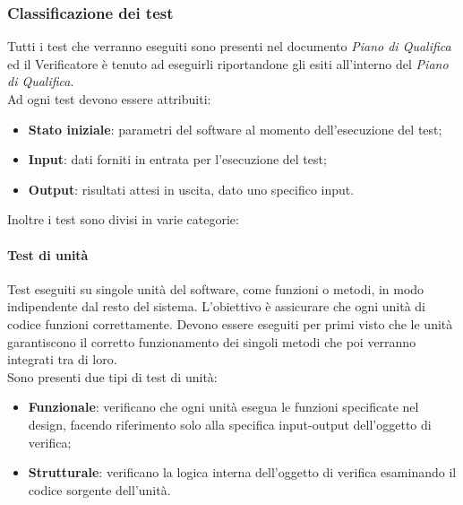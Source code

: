 \documentclass[10pt]{article}
\begin{document}
\begin{justify}
    \subsubsection{Classificazione dei test}
    Tutti i test che verranno eseguiti sono presenti nel documento \textit{Piano di Qualifica} ed il Verificatore è tenuto ad eseguirli riportandone gli esiti all'interno del \textit{Piano di Qualifica}.\\
    Ad ogni test devono essere attribuiti:
    \begin{itemize}
    \item \textbf{Stato iniziale}: parametri del software al momento dell'esecuzione del test;
    \item \textbf{Input}: dati forniti in entrata per l'esecuzione del test;
    \item \textbf{Output}: risultati attesi in uscita, dato uno specifico input.
    \end{itemize}
    Inoltre i test sono divisi in varie categorie:

    \paragraph{Test di unità}
    Test eseguiti su singole unità del software, come funzioni o metodi, in modo indipendente dal resto del sistema. L'obiettivo è assicurare che ogni unità di codice funzioni correttamente. Devono essere eseguiti per primi visto che le unità garantiscono il corretto funzionamento dei singoli metodi che poi verranno integrati tra di loro.\\
    Sono presenti due tipi di test di unità:
    \begin{itemize}
    \item \textbf{Funzionale}: verificano che ogni unità esegua le funzioni specificate nel design, facendo riferimento solo alla specifica input-output dell'oggetto di verifica;
    \item \textbf{Strutturale}: verificano la logica interna dell'oggetto di verifica esaminando il codice sorgente dell'unità.
    \end{itemize}


\end{justify}
\end{document}
